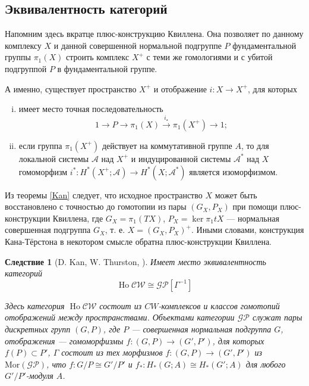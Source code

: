 \documentclass[14pt, dvipsnames, twoside]{extarticle}
\newtheorem{corollary}{Следствие}[theorem]
\theoremstyle{definition}
\theoremstyle{remark}
\DeclareMathOperator{\Ho}{\mathrm{Ho}}
\begin{document}
\subsection{Эквивалентность категорий}\label{equivalence}

Напомним здесь вкратце плюс-конструкцию Квиллена. Она позволяет по данному комплексу $X$ и данной совершенной нормальной подгруппе $P$ фундаментальной группы $\pi_1(X)$ строить комплекс $X^+$ с теми же гомологиями и с убитой подгруппой $P$ в фундаментальной группе. 

А именно, существует пространство $X^+$ и отображение $i:X\to X^+$, для которых 

\begin{enumerate}[i)]

\item имеет место точная последовательность $$1\to P\to \pi_1(X)\overset{i_{\star}}{\to} \pi_1(X^+)\to 1;$$

\item если группа $\pi_1(X^+)$ действует на коммутативной группе $A$, то для локальной системы $\mathcal{A}$ над $X^+$  и индуцированной системы $\mathcal{A}^\ast$ над $X$ гомоморфизм $i^\ast:H^\ast(X^+; \mathcal{A})\to H^\ast(X; \mathcal{A}^\ast)$ является изоморфизмом.

\end{enumerate}

Из теоремы \ref{Kan} следует, что исходное пространство $X$ может быть восстановлено с точностью до гомотопии из пары $(G_X, P_X)$ при помощи плюс-конструкции Квиллена, где $G_X = \pi_1(TX)$, $P_X = \ker \pi_1 t X$ --- нормальная совершенная подгруппа $G_X$, т. е. $X = (G_X, P_X)^+$. Иными словами, конструкция Кана-Тёрстона в некотором смысле обратна плюс-конструкции Квиллена. 


\begin{corollary}[D. Kan, W. Thurston, \cite{Kan}]

Имеет место эквивалентность категорий $$\Ho \mathscr{CW}\cong \mathscr{GP}[\Gamma^{-1}]$$ 

Здесь категория $\Ho\mathscr{CW}$ состоит из $CW$-комплексов и классов гомотопий отображений между пространствами. Объектами категории $\mathscr{GP}$ служат пары дискретных групп $(G, P)$, где $P$ --- совершенная нормальная подгруппа $G$, отображения --- гомоморфизмы $f:(G, P)\to (G', P')$, для которых $f(P)\subset P'$, $\Gamma$ состоит из тех морфизмов $f:(G, P)\to (G', P')$ из $\mathrm{Mor}(\mathscr{GP})$, что $f: G/P\cong G'/P'$ и $f_\ast: H_\ast(G; A)\cong H_\ast (G'; A)$ для любого $G'/P'$-модуля $A$.
\end{corollary} 
\end{document}
